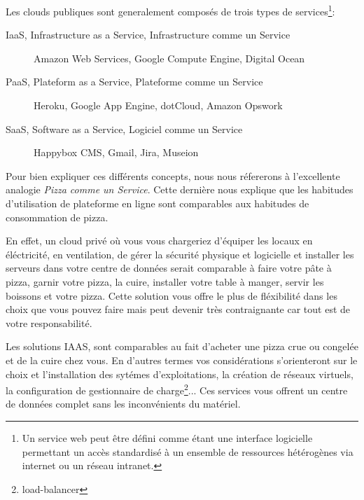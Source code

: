 \documentclass[11pt, a4paper ]{report}
\begin{document}
Les clouds publiques sont generalement composés de trois types de services\footnote{Un service web\cite{webServicesDef} peut être défini comme étant une interface logicielle permettant un accès standardisé à un ensemble de ressources hétérogènes via internet ou un réseau intranet.}:
\begin{description}

	\item[IaaS, Infrastructure as a Service, Infrastructure comme un Service] Amazon Web Services, Google Compute Engine, Digital Ocean

	\item[PaaS, Plateform as a Service, Plateforme comme un Service] Heroku, Google App Engine, dotCloud, Amazon Opswork

	\item[SaaS, Software as a Service, Logiciel comme un Service]
	Happybox CMS, Gmail, Jira, Museion

\end{description}

Pour bien expliquer ces différents concepts, nous nous réfererons à l'excellente analogie \emph{Pizza comme un Service}\cite{PizzaasaService}. Cette dernière nous explique que les habitudes d'utilisation de plateforme en ligne sont comparables aux habitudes de consommation de pizza.

En effet, un cloud privé où vous vous chargeriez d'équiper les locaux en éléctricité, en ventilation, de gérer la sécurité physique et logicielle et installer les serveurs dans votre centre de données serait comparable à faire votre pâte à pizza, garnir votre pizza, la cuire, installer votre table à manger, servir les boissons et votre pizza. Cette solution vous offre le plus de fléxibilité dans les choix que vous pouvez faire mais peut devenir très contraignante car tout est de votre responsabilité. 

Les solutions IAAS, sont comparables au fait d'acheter une pizza crue ou congelée et de la cuire chez vous. En d'autres termes vos considérations s'orienteront sur le choix et l'installation des sytémes d'exploitations, la création de réseaux virtuels, la configuration de gestionnaire de charge\footnote{load-balancer}... Ces services vous offrent un centre de données complet sans les inconvénients du matériel. 
\end{document}
